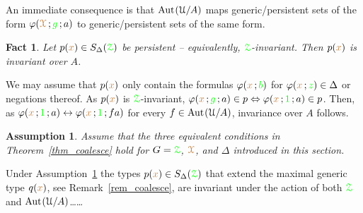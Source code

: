 \documentclass[10pt,openany]{amsproc}
\makeatletter
\newcommand{\mylabel}[1]{{\ssf{#1}}\hfill}
\renewenvironment{itemize}
  {\begin{list}{}{%
   \setlength{\parskip}{0mm}
   \setlength{\topsep}{.2\baselineskip}
   \setlength{\rightmargin}{0mm}
   \setlength{\listparindent}{0mm}
   \setlength{\itemindent}{0mm}
   \setlength{\labelwidth}{2ex}
   \setlength{\itemsep}{.1\baselineskip}
   \setlength{\parsep}{0mm}
   \setlength{\partopsep}{0mm}
   \setlength{\labelsep}{1ex}
   \setlength{\leftmargin}{\labelwidth+\labelsep}
   \let\makelabel\mylabel
   }}
   {\vspace*{-.3\baselineskip}\end{list}}
\def\Aut{{\rm Aut\kern.15ex}}
\def\iff{\leftrightarrow}
\def\D{\EuScript D}
\def\X{\EuScript X}
\def\Z{\EuScript Z}
\def\U{\EuScript U}
\def\G{\EuScript G}
\def\phi{\varphi}
\def\ssf#1{\textsf{\small #1}}
\newcounter{thm}
\theoremstyle{mio}
\newtheorem{fact}[thm]{Fact}\tcolorboxenvironment{fact}{mythm}
\newtheorem{assumption}[thm]{Assumption}\tcolorboxenvironment{assumption}{mythm}
\providecommand{\proofNameStyle}{\bfseries}
\renewenvironment{proof}[1][\proofname]{\par
  \pushQED{\qed}%
  \normalfont%
  \trivlist
  \item[\hskip\labelsep
        \proofNameStyle
    #1\@addpunct{.}]\ignorespaces
}{%
  \popQED\endtrivlist\@endpefalse
}
\def\mr{\color{brown}}
\def\gr{\color{green}}
\def\mrD{{\mr\D}}
\def\mrG{{\mr\G}}
\def\mrX{{\mr\X}}
\def\grG{{\gr\G}}
\def\grZ{{\gr\Z}}
\makeatother
\begin{document}
 
An immediate consequence is that $\Aut(\U/A)$ maps generic/persistent sets of the form $\phi(\mrX\,;{\gr g}\,;a)$ to generic/persistent sets of the same form.

\begin{fact} 
  Let $p({\mr x})\in S_\Delta(\grZ)$ be persistent -- equivalently, $\grZ$-invariant. Then $p({\mr x})$ is invariant over $A$.
\end{fact}

\begin{proof}
  We may assume that $p({\mr x})$ only contain the formulas $\phi({\mr x}\,;{\gr b})$ for $\phi({\mr x}\,;{\gr z})\in\Delta$ or negations thereof.
  As $p({\mr x})$ is $\grZ$-invariant, $\phi({\mr x}\,;{\gr g}\,;a)\in p\Leftrightarrow\phi({\mr x}\,;{\gr 1}\,;a)\in p$.
  Then, as $\phi({\mr x}\,;{\gr 1}\,;a)\iff\phi({\mr x}\,;{\gr 1}\,;fa)$ for every $f\in\Aut(\U/A)$, invariance over $A$ follows.
\end{proof}






\begin{assumption}\label{ass_2}
  Assume that the three equivalent conditions in Theorem~\ref{thm_coalesce} hold for $G=\grZ$, $\mrX$, and $\Delta$ introduced in this section.
\end{assumption}

Under Assumption~\ref{ass_2} the types $p({\mr x})\in S_\Delta(\grZ)$ that extend the maximal generic type $q({\mr x})$, see Remark~\ref{rem_coalesce}, are invariant under the action of both $\grZ$ and $\Aut(\U/A)$\ldots\ldots
\end{document}
